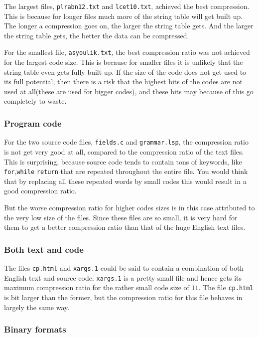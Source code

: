 The largest files, \verb|plrabn12.txt| and \verb|lcet10.txt|, achieved
the best compression. This is because for longer files much more of
the string table will get built up. The longer a compression goes on,
the larger the string table gets. And the larger the string table
gets, the better the data can be compressed.

For the smallest file, \verb|asyoulik.txt|, the best compression ratio
was not achieved for the largest code size. This is because for
smaller files it is unlikely that the string table even gets fully
built up. If the size of the code does not get used to its full
potential, then there is a risk that the highest bits of the codes are
not used at all(these are used for bigger codes), and these bits may
because of this go completely to waste.

\subsubsection{Program code}

For the two source code files, \verb|fields.c| and \verb|grammar.lsp|,
the compression ratio is not get very good at all, compared to the
compression ratio of the text files. This is surprising, because
source code tends to contain tons of keywords, like
\verb|for|,\verb|while| \verb|return| that are repeated throughout the
entire file. You would think that by replacing all these repeated
words by small codes this would result in a good compression ratio.

But the worse compression ratio for higher codes sizes is in this case
attributed to the very low size of the files. Since these files are so
small, it is very hard for them to get a better compression ratio than
that of the huge English text files.

\subsubsection{Both text and code}

The files \verb|cp.html| and \verb|xargs.1| could be said to contain a
combination of both English text and source
code. \verb|xargs.1| is a pretty small file and hence gets its maximum
compression ratio for the rather small code size of $11$. The file
\verb|cp.html| is bit larger than the former, but the compression
ratio for this file behaves in largely the same way.

\subsubsection{Binary formats}


